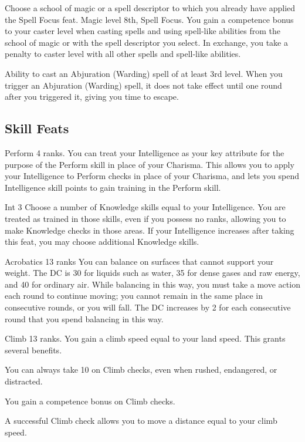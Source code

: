Choose a school of magic or a spell descriptor to which you already have applied the Spell Focus feat.
\featpre Magic level 8th, Spell Focus.
\featben You gain a  competence bonus to your caster level when casting spells and using spell-like abilities from the school of magic or with the spell descriptor you select. In exchange, you take a  penalty to caster level with all other spells and spell-like abilities.

\featpre Ability to cast an Abjuration (Warding) spell of at least 3rd level.
\featben When you trigger an Abjuration (Warding) spell, it does not take effect until one round after you triggered it, giving you time to escape.

\subsection{Skill Feats}

\featpre Perform 4 ranks.
\featben You can treat your Intelligence as your key attribute for the purpose of the Perform skill in place of your Charisma. This allows you to apply your Intelligence to Perform checks in place of your Charisma, and lets you spend Intelligence skill points to gain training in the Perform skill.

 Int 3
 Choose a number of Knowledge skills equal to your Intelligence. You are treated as trained in those skills, even if you possess no ranks, allowing you to make Knowledge checks in those areas. If your Intelligence increases after taking this feat, you may choose additional Knowledge skills.

\featpre Acrobatics 13 ranks
\featben You can balance on surfaces that cannot support your weight. The DC is 30 for liquids such as water, 35 for dense gases and raw energy, and 40 for ordinary air. While balancing in this way, you must take a move action each round to continue moving; you cannot remain in the same place in consecutive rounds, or you will fall. The DC increases by 2 for each consecutive round that you spend balancing in this way.

\featpre Climb 13 ranks.
\featben You gain a climb speed equal to your land speed. This grants several benefits. 
\begin{itemize*}
  \item You can always take 10 on Climb checks, even when rushed, endangered, or distracted. 
  \item You gain a  competence bonus on Climb checks.
  \item A successful Climb check allows you to move a distance equal to your climb speed.
\end{itemize*}

